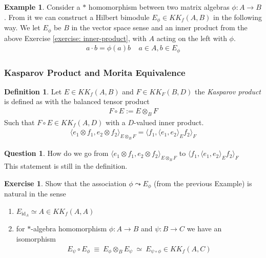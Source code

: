 \documentclass[a4paper]{article}
\theoremstyle{definition}
\newtheorem{definition}{Definition}
\theoremstyle{definition}
\newtheorem{question}{Question}
\theoremstyle{definition}
\newtheorem{example}{Example}
\theoremstyle{theorem}
\theoremstyle{theorem}
\newtheorem{exercise}{Exercise}
\theoremstyle{theorem}
\theoremstyle{definition}
\begin{document}
\begin{example}
    Consider a $*$ homomorphism between two matrix algebras $\phi:A\rightarrow B$.
    From it we can construct a Hilbert bimodule $E_{\phi} \in KK_f(A, B)$ in the following way.
    We let $E_{\phi}$ be $B$ in the vector space sense and an inner product from the above
    Exercise \ref{exercise: inner-product}, with $A$ acting on the left with $\phi$.
    \begin{align*}
        a\cdot b = \phi(a)b \;\;\;\; a\in A, b\in E_{\phi}
    \end{align*}
\end{example}



\subsubsection{Kasparov Product and Morita Equivalence}
\begin{definition}
    Let $E \in KK_f(A, B)$ and $F \in KK_F(B, D)$ the \textit{Kasparov product} is defined as
    with the balanced tensor product
    \begin{align*}
        F \circ E := E \otimes _B F
    \end{align*}
    Such that $F\circ E \in KK_f(A,D)$ with a $D$-valued inner product.
    \begin{align*}
        \langle e_1 \otimes f_1, e_2 \otimes f_2\rangle _{E\otimes _B F} = \langle f_1,\langle e_1, e_2\rangle _E f_2\rangle _F
    \end{align*}
\end{definition}

\begin{question}
 How do we go from $\langle e_1 \otimes f_1, e_2 \otimes f_2\rangle _{E\otimes _B F}$ to $
    \langle f_1,\langle e_1, e_2\rangle _E f_2\rangle _F$ \label{q: tensorproduct}\\
    This statement is still in the definition.
\end{question}


\begin{exercise}
    Show that the association $\phi \leadsto E_\phi$ (from the previous Example) is natural
    in the sense
    \begin{enumerate}
        \item $E_{\text{id}_A} \simeq A \in KK_f(A,A)$
        \item for $*$-algebra homomorphism $\phi: A \rightarrow B$ and $\psi: B \rightarrow C$ we have
            an isomorphism
            \begin{align*}
                E_{\psi} \circ E_{\phi}\ \equiv\ E_{\phi} \otimes _B E_{\psi}\ \simeq\
                E_{\psi \circ \phi} \in KK_f(A,C)
            \end{align*}
    \end{enumerate}
\end{exercise}
\end{document}

